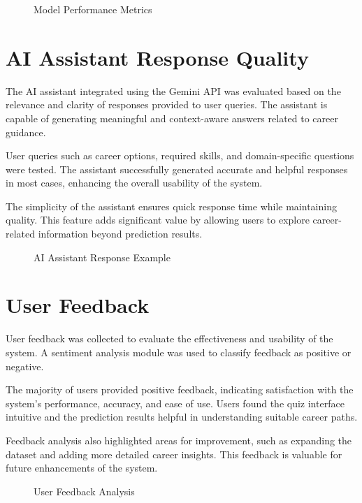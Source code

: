 \documentclass[12pt,a4paper]{report}
\begin{document}
{\begin{figure}[h]
\centering
{}
\caption{Model Performance Metrics}
\end{figure}

\section{AI Assistant Response Quality}

The AI assistant integrated using the Gemini API was evaluated based on the relevance and clarity of responses provided to user queries. The assistant is capable of generating meaningful and context-aware answers related to career guidance.

User queries such as career options, required skills, and domain-specific questions were tested. The assistant successfully generated accurate and helpful responses in most cases, enhancing the overall usability of the system.

The simplicity of the assistant ensures quick response time while maintaining quality. This feature adds significant value by allowing users to explore career-related information beyond prediction results.

\begin{figure}[h]
\centering
{}
\caption{AI Assistant Response Example}
\end{figure}

\section{User Feedback}

User feedback was collected to evaluate the effectiveness and usability of the system. A sentiment analysis module was used to classify feedback as positive or negative.

The majority of users provided positive feedback, indicating satisfaction with the system’s performance, accuracy, and ease of use. Users found the quiz interface intuitive and the prediction results helpful in understanding suitable career paths.

Feedback analysis also highlighted areas for improvement, such as expanding the dataset and adding more detailed career insights. This feedback is valuable for future enhancements of the system.

\begin{figure}[h]
\centering
{}
\caption{User Feedback Analysis}
\end{figure}

}
\end{document}
